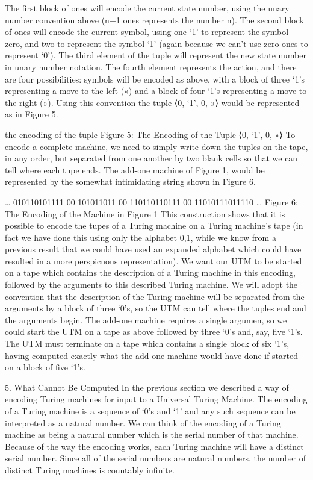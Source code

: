 The first block of ones will encode the current state number, using the unary number convention above (n+1 ones represents the number n).
The second block of ones will encode the current symbol, using one ‘1’ to represent the symbol zero, and two to represent the symbol ‘1’ (again because we can't use zero ones to represent ‘0’).
The third element of the tuple will represent the new state number in unary number notation.
The fourth element represents the action, and there are four possibilities: symbols will be encoded as above, with a block of three ‘1’s representing a move to the left («) and a block of four ‘1’s representing a move to the right (»).
Using this convention the tuple ⟨0, ‘1’, 0, »⟩ would be represented as in Figure 5.


the encoding of the tuple 
Figure 5: The Encoding of the Tuple ⟨0, ‘1’, 0, »⟩ 
To encode a complete machine, we need to simply write down the tuples on the tape, in any order, but separated from one another by two blank cells so that we can tell where each tupe ends. The add-one machine of Figure 1, would be represented by the somewhat intimidating string shown in Figure 6.

… 010110101111 00 101011011 00 110110110111 00 11010111011110 … 
Figure 6: The Encoding of the Machine in Figure 1
This construction shows that it is possible to encode the tupes of a Turing machine on a Turing machine's tape (in fact we have done this using only the alphabet {0,1}, while we know from a previous result that we could have used an expanded alphabet which could have resulted in a more perspicuous representation). We want our UTM to be started on a tape which contains the description of a Turing machine in this encoding, followed by the arguments to this described Turing machine. We will adopt the convention that the description of the Turing machine will be separated from the arguments by a block of three ‘0’s, so the UTM can tell where the tuples end and the arguments begin. The add-one machine requires a single argumen, so we could start the UTM on a tape as above followed by three ‘0’s and, say, five ‘1’s. The UTM must terminate on a tape which contains a single block of six ‘1’s, having computed exactly what the add-one machine would have done if started on a block of five ‘1’s.

5. What Cannot Be Computed
In the previous section we described a way of encoding Turing machines for input to a Universal Turing Machine. The encoding of a Turing machine is a sequence of ‘0’s and ‘1’ and any such sequence can be interpreted as a natural number. We can think of the encoding of a Turing machine as being a natural number which is the serial number of that machine. Because of the way the encoding works, each Turing machine will have a distinct serial number. Since all of the serial numbers are natural numbers, the number of distinct Turing machines is countably infinite.

